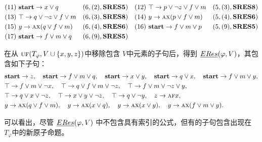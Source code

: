 \documentclass[9pt, CJK]{beamer}
\begin{document}
\begin{frame}
{{\begin{example}
\begin{align*}
				&(11)\ \textbf{start} \rightarrow x \vee q && (6,(2), \textbf{SRES5})
				&& (12)\ \top \rightarrow p \vee \neg z \vee f \vee m && (5,(3), \textbf{SRES8})\\
				& (13)\ \top \rightarrow q \vee \neg z \vee f \vee m && (6,(3), \textbf{SRES8})
				&&(14)\ y \rightarrow \textsc{a}\textsc{x}(p \vee f\vee m) && (5, (4), \textbf{SRES6})\\
				&(15)\ y \rightarrow \textsc{a}\textsc{x}(q \vee f\vee m) && (6, (4), \textbf{SRES6})
				&&(16)\ \textbf{start} \rightarrow f\vee m \vee p && (5, (9), \textbf{SRES5}) \\
				&(17)\ \textbf{start} \rightarrow f\vee m \vee q && (6, (9), \textbf{SRES5})
			\end{align*}
			
			在从 $\textsc{uf}(T_\varphi, V\cup \{x,y,z\})$中移除包含 $V$中元素的子句后，得到 $\emph{ERes}(\varphi,V)$，其包含如下子句：
			\begin{align*}%
				&\start\rto z, \quad \start \rto f\vee m \vee q, \quad  \start \rto x \vee y, \quad \start \rto q \vee x, \quad	\start \rto f\vee m \vee y, \\
				& \top \rto f \vee m \vee \neg x, \quad		\top \rto q \vee f \vee m\vee \neg z,
				\quad  	\top \rto f \vee m \vee \neg z \vee y,\\
				& \top \rto q \vee x\vee \neg z, \quad 	\top \rto x \vee y \vee \neg z, \quad 	\top \rto q\vee\neg y , \quad z \rto \ALL \FUTURE x, \\
				& y \rto \ALL\NEXT(q \vee f\vee m), \quad  y \rto \ALL\NEXT(x\vee q), \quad y \rto \ALL \NEXT(x\vee y),\quad 	y \rto \ALL\NEXT(f\vee m\vee y).
			\end{align*}
			
			可以看出，尽管 $\emph{ERes}(\varphi,V)$ 中不包含具有索引的公式，但有的子句包含出现在 $T_\varphi$中的新原子命题。
		\end{example}
	}
	}
\end{frame}
\end{document}
